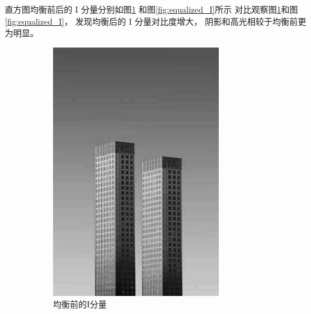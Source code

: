 \documentclass[UTF8]{article}
\begin{document}
直方图均衡前后的 I 分量分别如图\ref{fig:original_I}
和图\ref{fig:equalized_I}所示
对比观察图\ref{fig:original_I}和图\ref{fig:equalized_I}，
发现均衡后的 I 分量对比度增大，
阴影和高光相较于均衡前更为明显。
\begin{figure}[htbp]
    \centering
    \begin{subfigure}{0.45\textwidth}
      \centering
      \includegraphics[width=0.8\textwidth]{img/original_I.jpg}
      \caption{均衡前的I分量}
      \label{fig:original_I} %
    \end{subfigure}
    \begin{subfigure}{0.45\textwidth}
      \centering

\end{subfigure}
\end{figure}
\end{document}
